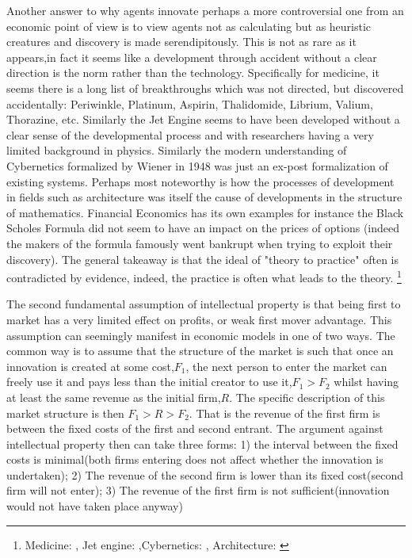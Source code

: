 \documentclass[12pt]{article}
\numberwithin{equation}{section}
\begin{document}
Another answer to why agents innovate perhaps a more controversial one from an economic point of view is to view agents not as calculating but as heuristic creatures and discovery is made serendipitously. This is not as rare as it appears,in fact it seems like a development through accident without a clear direction is the norm rather than the technology. Specifically for medicine, it seems there is a long list of breakthroughs which was not directed, but discovered accidentally: Periwinkle, Platinum, Aspirin, Thalidomide, Librium, Valium, Thorazine, etc. Similarly the Jet Engine seems to have been developed without a clear sense of the developmental process and with researchers having a very limited background in physics. Similarly the modern understanding of Cybernetics formalized by Wiener in 1948 was just an ex-post formalization of existing systems. Perhaps most noteworthy is how the processes of development in fields such as architecture was itself the cause of developments in the structure of mathematics. Financial Economics has its own examples for instance the Black Scholes Formula did not seem to have an impact on the prices of options (indeed the makers of the formula famously went bankrupt when trying to exploit their discovery). The general takeaway is that the ideal of "theory to practice" often is contradicted by evidence, indeed, the practice is often what leads to the theory. \footnote{ Medicine: \cite{meyers2007happy}, Jet engine: \cite{scranton2006urgency},Cybernetics: \cite{mindell2002between}, Architecture: \cite{unguru1992guy}}





The second fundamental assumption of intellectual property is that being first to market has a very limited effect on profits, or weak first mover advantage. This assumption can seemingly manifest in economic models in one of two ways. The common way is to assume that the structure of the market is such that once an innovation is created at some cost,$F_1$, the next person to enter the market can freely use it and pays less than the initial creator to use it,$F_1>F_2$ whilst having at least the same revenue as the initial firm,$R$. The specific description of this market structure is then $F_1>R>F_2$. That is the revenue of the first firm is between the fixed costs of the first and second entrant. The argument against intellectual property then can take three forms: 1) the interval between the fixed costs is minimal(both firms entering does not affect whether the innovation is undertaken); 2) The revenue of the second firm is lower than its fixed cost(second firm will not enter); 3) The revenue of the first firm is not sufficient(innovation would not have taken place anyway)
\end{document}
